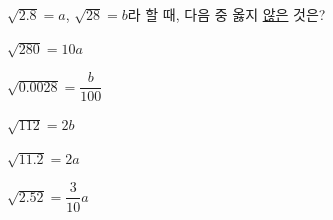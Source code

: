 $\sqrt{2.8}=a$, $\sqrt{28}=b$라 할 때, 다음 중 옳지 \underline{않은} 것은?
\begin{choicesii}{\rule[-3ex]{0pt}{8ex}$\sqrt{280}=10a$}{\rule[-3ex]{0pt}{8ex}$\sqrt{0.0028}=\dfrac{b}{100}$}{\rule[-3ex]{0pt}{8ex}$\sqrt{112}=2b$}{\rule[-3ex]{0pt}{8ex}$\sqrt{11.2}=2a$}{\rule[-3ex]{0pt}{8ex}$\sqrt{2.52}=\dfrac{3}{10}a$}\end{choicesii}
